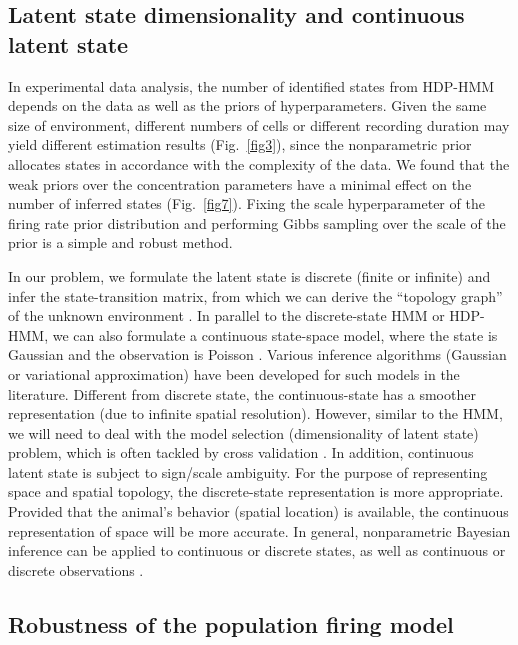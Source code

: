 \subsection{Latent state dimensionality and continuous latent state}

In experimental data analysis, the number of identified  states from HDP-HMM depends on  the data as well as the priors of hyperparameters. Given the same size of environment, different numbers of cells or different recording duration  may yield different estimation results (Fig.~\ref{fig3}), since the nonparametric prior allocates states in accordance with the complexity of the data. We found that the weak priors over the concentration parameters have a minimal effect on the number of inferred states (Fig.~\ref{fig7}). Fixing the scale hyperparameter of the firing rate prior distribution and performing Gibbs sampling over the scale of the prior is a simple and robust method. 


 
In our problem, we formulate the latent state is discrete (finite or infinite) and infer the state-transition matrix, from which we can derive the ``topology graph'' of the unknown environment \citep{Chen12a,Chen14}. In parallel to the discrete-state HMM or HDP-HMM, we can also formulate a continuous state-space model, where the state is Gaussian and the observation is Poisson \citep{Brown98,Smith03,Yu09,Buesing12}. Various inference algorithms (Gaussian or variational approximation) have been developed for such models in the literature. Different from discrete state, the continuous-state has a smoother representation (due to infinite spatial resolution). However, similar to the HMM, we will need to deal with the model selection (dimensionality of latent state) problem, which is often tackled by cross validation \citep{Yu09}. In addition, continuous latent state is subject to sign/scale ambiguity. For the purpose of representing space and spatial topology, the discrete-state representation is more appropriate. Provided that the animal's behavior (spatial location) is available, the continuous representation of space will be more accurate. In general, nonparametric Bayesian inference can be applied to continuous or discrete states, as well as continuous or discrete observations \citep{Teh06,van08,Fox08,Fox10,Chen15Book}.



\subsection{Robustness of the population firing model}

